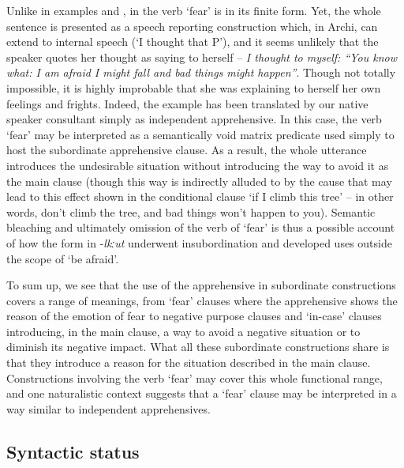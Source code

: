\documentclass[output=paper,colorlinks,citecolor=brown]{langscibook}
\begin{document}
\noindent Unlike in examples  and , in  the verb `fear' is in its finite form. Yet, the whole sentence is presented as a speech reporting construction which, in Archi, can extend to internal speech (`I thought that P'), and it seems unlikely that the speaker quotes her thought as saying to herself -- \textit{I thought to myself: ``You know what: I am afraid I might fall and bad things might happen''}. Though not totally impossible, it is highly improbable that she was explaining to herself her own feelings and frights. Indeed, the example has been translated by our native speaker consultant simply as independent apprehensive. In this case, the verb `fear' may be interpreted as a semantically void matrix predicate used simply to host the subordinate apprehensive clause. As a result, the whole utterance introduces the undesirable situation without introducing the way to avoid it as the main clause (though this way is indirectly alluded to by the cause that may lead to this effect shown in the conditional clause `if I climb this tree' -- in other words, don't climb the tree, and bad things won't happen to you). Semantic bleaching and ultimately omission of the verb of `fear' is thus a possible account of how the form in \nobreakdash-\textit{lkːut} underwent insubordination and developed uses outside the scope of `be afraid'. 

To sum up, we see that the use of the apprehensive in subordinate constructions covers a range of meanings, from `fear' clauses where the apprehensive shows the reason of the emotion of fear to negative purpose clauses and `in-case' clauses introducing, in the main clause, a way to avoid a negative situation or to diminish its negative impact. What all these subordinate constructions share is that they introduce a reason for the situation described in the main clause. Constructions involving the verb  `fear' may cover this whole functional range, and one naturalistic context suggests that a `fear' clause may be interpreted in a way similar to independent apprehensives.
 

\subsection{Syntactic status}
\label{subsec:Asyntactic}
\largerpage
\end{document}
